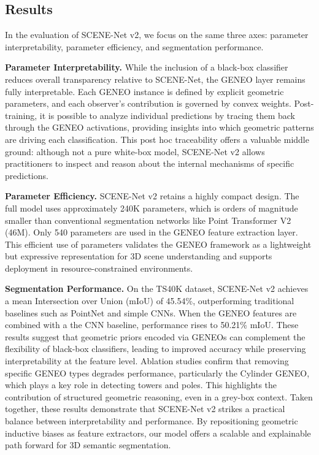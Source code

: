 \subsection{Results}

In the evaluation of SCENE-Net v2, we focus on the same three axes: parameter
interpretability, parameter efficiency, and segmentation performance.

\textbf{Parameter Interpretability.} \;
While the inclusion of a black-box classifier reduces overall transparency
relative to SCENE-Net, the GENEO layer remains fully interpretable. Each
GENEO instance is defined by explicit geometric parameters, and each observer's
contribution is governed by convex weights. Post-training, it is possible to
analyze individual predictions by tracing them back through the GENEO
activations, providing insights into which geometric patterns are driving each
classification. This post hoc traceability offers a valuable middle ground:
although not a pure white-box model, SCENE-Net v2 allows practitioners to
inspect and reason about the internal mechanisms of specific predictions.

\textbf{Parameter Efficiency.} \;
SCENE-Net v2 retains a highly compact design. The full model uses approximately
240K parameters, which is orders of magnitude smaller than conventional
segmentation networks like Point Transformer V2 (46M). Only 540 parameters are
used in the GENEO feature extraction layer. This efficient use of parameters
validates the GENEO framework as a lightweight but expressive representation
for 3D scene understanding and supports deployment in resource-constrained
environments.

\textbf{Segmentation Performance.} \;
On the TS40K dataset, SCENE-Net v2 achieves a mean Intersection over Union
(mIoU) of 45.54\%, outperforming traditional baselines such as PointNet and
simple CNNs. When the GENEO features are combined with a the
CNN baseline, performance rises to 50.21\% mIoU. These results suggest that
geometric priors encoded via GENEOs can complement the flexibility of black-box
classifiers, leading to improved accuracy while preserving interpretability at
the feature level.
%
Ablation studies confirm that removing specific GENEO types degrades
performance, particularly the Cylinder GENEO, which plays a key role in
detecting towers and poles. This highlights the contribution of structured
geometric reasoning, even in a grey-box context.
%
Taken together, these results demonstrate that SCENE-Net v2 strikes a practical
balance between interpretability and performance. By repositioning geometric
inductive biases as feature extractors, our model offers a scalable and
explainable path forward for 3D semantic segmentation.

